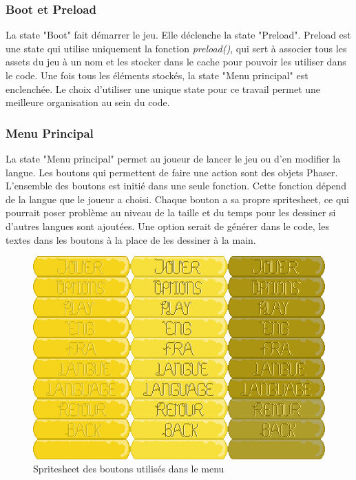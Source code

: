 \documentclass[11pt]{article}
\begin{document}
\begin{appendices}
\subsubsection{Boot et Preload}
La state "Boot" fait démarrer le jeu. Elle déclenche la state "Preload". Preload est une state qui utilise uniquement la fonction \textit{preload()}, qui sert à associer tous les assets du jeu à un nom et les stocker dans le cache pour pouvoir les utiliser dans le code. Une fois tous les éléments stockés, la state "Menu principal" est enclenchée. Le choix d'utiliser une unique state pour ce travail permet une meilleure organisation au sein du code.
\subsubsection{Menu Principal}
La state "Menu principal" permet au joueur de lancer le jeu ou d'en modifier la langue. Les boutons qui permettent de faire une action sont des objets Phaser. L'ensemble des boutons est initié dans une seule fonction. Cette fonction dépend de la langue que le joueur a choisi. Chaque bouton a sa propre spritesheet, ce qui pourrait poser problème au niveau de la taille et du temps pour les dessiner si d'autres langues sont ajoutées. Une option serait de générer dans le code, les textes dans les boutons à la place de les dessiner à la main.
\begin{figure}[H]
\includegraphics[scale=0.3]{boutons}
\centering
\caption{Spritesheet des boutons utilisés dans le menu}
\end{figure}

\end{appendices}
\end{document}
